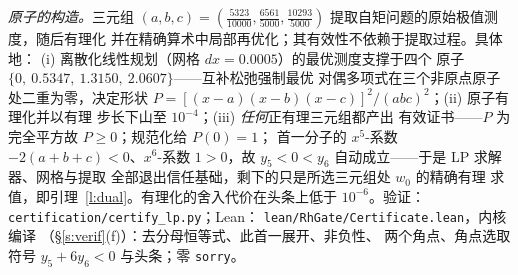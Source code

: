 \documentclass[11pt]{article}
\numberwithin{equation}{section}
\theoremstyle{definition}
\theoremstyle{remark}
\begin{document}
\emph{原子的构造。}三元组
$(a,b,c)=(\tfrac{5323}{10000},\tfrac{6561}{5000},
\tfrac{10293}{5000})$ 提取自矩问题的原始极值测度，随后有理化
并在精确算术中局部再优化；其有效性不依赖于提取过程。具体地：
(i) 离散化线性规划（网格 $dx=0.0005$）的最优测度支撑于四个
原子 $\{0,\ 0.5347,\ 1.3150,\ 2.0607\}$——互补松弛强制最优
对偶多项式在三个非原点原子处二重为零，决定形状
$P=[(x-a)(x-b)(x-c)]^{2}/(abc)^{2}$；(ii) 原子有理化并以有理
步长下山至 $10^{-4}$；(iii) \emph{任何}正有理三元组都产出
有效证书——$P$ 为完全平方故 $P\ge0$；规范化给 $P(0)=1$；
首一分子的 $x^{5}$-系数 $-2(a{+}b{+}c)<0$、$x^{6}$-系数
$1>0$，故 $y_5<0<y_6$ 自动成立——于是 LP 求解器、网格与提取
全部退出信任基础，剩下的只是所选三元组处 $w_0$ 的精确有理
求值，即引理~\ref{l:dual}。有理化的舍入代价在头条上低于 $10^{-6}$。验证：
\texttt{certification/certify\_lp.py}；Lean：
\texttt{lean/RhGate/Certificate.lean}，内核编译
（\S\ref{s:verif}(f)）：去分母恒等式、此首一展开、非负性、
两个角点、角点选取符号 $y_5+6y_6<0$ 与头条；零
\texttt{sorry}。
\end{document}
